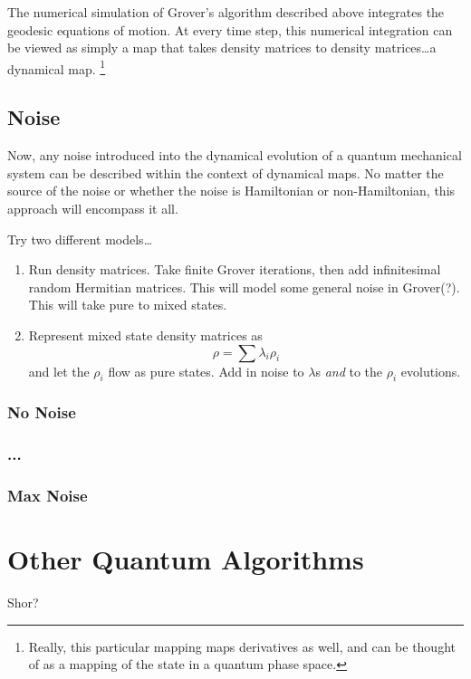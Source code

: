 
The numerical simulation of Grover's algorithm described above
integrates the geodesic equations of motion.  At every time step,
this numerical integration can be viewed as simply a map that
takes density matrices to density matrices\dots a dynamical map.
\footnote{Really, this particular mapping maps derivatives as well, and
can be thought of as a mapping of the state in a quantum phase 
space.}

\subsection{Noise}

Now, any noise introduced into the dynamical evolution of a 
quantum mechanical system can be described within the context 
of dynamical maps.  
No matter the source of the noise or whether the noise is 
Hamiltonian or non-Hamiltonian, this approach will encompass
it all.

Try two different models\dots
\begin{enumerate}
\item Run density matrices.  Take finite Grover iterations, then add
infinitesimal random Hermitian matrices.  This will model some general
noise in Grover(?). This will take pure to mixed states.
\item Represent mixed state density matrices as
\begin{equation}
\rho = \sum\lambda_i\rho_i
\end{equation}
and let the $\rho_i$ flow as pure states.  Add in noise to $\lambda$s
{\sl and} to the $\rho_i$ evolutions.
\end{enumerate}

\subsubsection{No Noise}
\subsubsection{...}
\subsubsection{Max Noise}



\section{Other Quantum Algorithms}

Shor?
